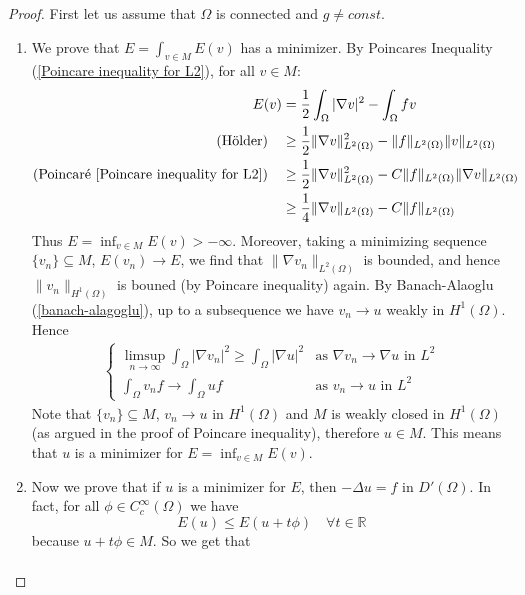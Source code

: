 \documentclass{report}
\theoremstyle{tommy}
\begin{document}
  \begin{proof}
    First let us assume that \(\Omega\) is connected and \(g \ne const\).
    \begin{enumerate}[label=Step \arabic*:]
      \item We prove that \(E = \int_{v \in M} E(v)\) has a minimizer. By Poincares Inequality (\ref{Poincare inequality for L2}), for all \(v \in M\):
      \begin{align*}
        E(v) 
        &= \frac{1}{2} \int_\Omega|\nabla v|^2 - \int_\Omega fv \\
        \text{(Hölder)}\quad&\ge \frac{1}{2} \|\nabla v\|_{L^2(\Omega)}^2 - \|f\|_{L^2(\Omega)} \|v\|_{L^2(\Omega)} \\
        \text{(Poincaré \ref{Poincare inequality for L2})}\quad&\ge \frac{1}{2} \|\nabla v\|_{L^2(\Omega)}^2 - C \|f\|_{L^2(\Omega)} \|\nabla v\|_{L^2(\Omega)} \\
        &\ge \frac{1}{4} \| \nabla v\|_{L^2(\Omega)} - C\|f\|_{L^2(\Omega)}
      \end{align*}
      Thus \(E = \inf_{v \in M} E(v) > - \infty\). Moreover, taking a minimizing sequence \(\{v_n\} \subseteq M\), \(E(v_n) \to E\), we find that \(\|\nabla v_n\|_{L^2(\Omega)}\) is bounded, and hence \(\|v_n\|_{H^1(\Omega)}\) is bouned (by Poincare inequality) again. By Banach-Alaoglu (\ref{banach-alagoglu}), up to a subsequence we have \(v_n \to u\) weakly in \(H^1(\Omega)\). Hence \begin{align*}
        \begin{cases}
          \limsup_{n \to \infty} \int_\Omega |\nabla v_n|^2 \ge \int_\Omega |\nabla u|^2 & \text{as } \nabla v_n \to \nabla u \text{ in } L^2 \\
          \int_\Omega v_n f \to \int_\Omega u f &\text{as } v_n \to u \text{ in } L^2
        \end{cases}
      \end{align*}
      Note that \(\{v_n\} \subseteq M\), \(v_n \to u\) in \(H^1(\Omega)\) and \(M\) is weakly closed in \(H^1(\Omega)\) (as argued in the proof of Poincare inequality), therefore \(u \in M\). This means that \(u\) is a minimizer for \(E = \inf_{v \in M} E(v)\).
      \item Now we prove that if \(u\) is a minimizer for \(E\), then \(- \Delta u = f\) in \(D'(\Omega)\). In fact, for all \(\phi \in C_c^\infty(\Omega)\) we have 
      \[E(u) \le E(u + t \phi) \quad \forall t \in \mathbb{R}\]
      because \(u + t \phi \in M\). So we get that 
      \begin{align*}

\end{align*}
\end{enumerate}
\end{proof}
\end{document}

